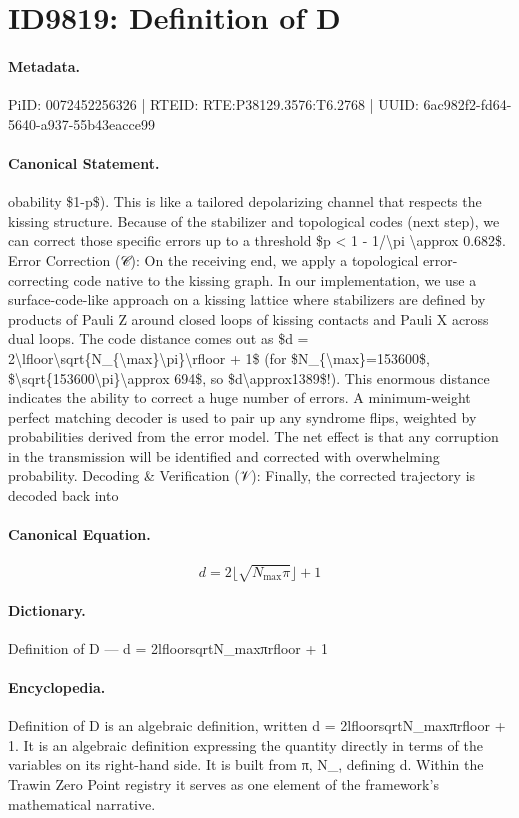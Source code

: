 \section*{ID9819: Definition of D}
\paragraph{Metadata.}
PiID: 0072452256326 | RTEID: RTE:P38129.3576:T6.2768 | UUID: 6ac982f2-fd64-5640-a937-55b43eacce99

\paragraph{Canonical Statement.}
obability \$1-p\$). This is like a tailored depolarizing channel that respects the kissing structure. Because of the stabilizer and topological codes (next step), we can correct those specific errors up to a threshold \$p < 1 - 1/\textbackslash{}pi \textbackslash{}approx 0.682\$. Error Correction (𝒞): On the receiving end, we apply a topological error-correcting code native to the kissing graph. In our implementation, we use a surface-code-like approach on a kissing lattice where stabilizers are defined by products of Pauli Z around closed loops of kissing contacts and Pauli X across dual loops. The code distance comes out as \$d = 2\textbackslash{}lfloor\textbackslash{}sqrt\{N\_\{\textbackslash{}max\}\textbackslash{}pi\}\textbackslash{}rfloor + 1\$ (for \$N\_\{\textbackslash{}max\}=153600\$, \$\textbackslash{}sqrt\{153600\textbackslash{}pi\}\textbackslash{}approx 694\$, so \$d\textbackslash{}approx1389\$!). This enormous distance indicates the ability to correct a huge number of errors. A minimum-weight perfect matching decoder is used to pair up any syndrome flips, weighted by probabilities derived from the error model. The net effect is that any corruption in the transmission will be identified and corrected with overwhelming probability. Decoding \& Verification (𝒱): Finally, the corrected trajectory is decoded back into

\paragraph{Canonical Equation.}
\[
d = 2\lfloor\sqrt{N_{\max}\pi}\rfloor + 1
\]

\paragraph{Dictionary.}
Definition of D — d = 2lfloorsqrtN\_maxπrfloor + 1

\paragraph{Encyclopedia.}
Definition of D is an algebraic definition, written d = 2lfloorsqrtN\_maxπrfloor + 1. It is an algebraic definition expressing the quantity directly in terms of the variables on its right-hand side. It is built from π, N\_, defining d. Within the Trawin Zero Point registry it serves as one element of the framework's mathematical narrative.
